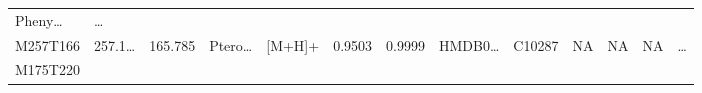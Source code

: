 \documentclass[
]{article}
\begin{document}
\begin{longtable}[]{@{}lllllllllllll@{}}
\begin{minipage}[t]{0.05\columnwidth}
Pheny\ldots{}\strut
\end{minipage} & \begin{minipage}[t]{0.02\columnwidth}\raggedright
\ldots{}\strut
\end{minipage}\tabularnewline
\begin{minipage}[t]{0.05\columnwidth}\raggedright
M257T166\strut
\end{minipage} & \begin{minipage}[t]{0.05\columnwidth}\raggedright
257.1\ldots{}\strut
\end{minipage} & \begin{minipage}[t]{0.05\columnwidth}\raggedright
165.785\strut
\end{minipage} & \begin{minipage}[t]{0.05\columnwidth}\raggedright
Ptero\ldots{}\strut
\end{minipage} & \begin{minipage}[t]{0.05\columnwidth}\raggedright
{[}M+H{]}+\strut
\end{minipage} & \begin{minipage}[t]{0.07\columnwidth}\raggedright
0.9503\strut
\end{minipage} & \begin{minipage}[t]{0.07\columnwidth}\raggedright
0.9999\strut
\end{minipage} & \begin{minipage}[t]{0.05\columnwidth}\raggedright
HMDB0\ldots{}\strut
\end{minipage} & \begin{minipage}[t]{0.04\columnwidth}\raggedright
C10287\strut
\end{minipage} & \begin{minipage}[t]{0.05\columnwidth}\raggedright
NA\strut
\end{minipage} & \begin{minipage}[t]{0.05\columnwidth}\raggedright
NA\strut
\end{minipage} & \begin{minipage}[t]{0.05\columnwidth}\raggedright
NA\strut
\end{minipage} & \begin{minipage}[t]{0.02\columnwidth}\raggedright
\ldots{}\strut
\end{minipage}\tabularnewline
\begin{minipage}[t]{0.05\columnwidth}\raggedright
M175T220\strut
\end{minipage} & \begin{minipage}[t]{0.05\columnwidth}\raggedright

\end{minipage}
\end{longtable}
\end{document}
